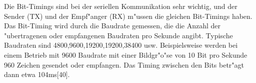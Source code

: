 Die Bit-Timings sind bei der seriellen Kommunikation sehr wichtig, 
und der Sender (TX) und der Empf"anger (RX) m"ussen die gleichen Bit-Timings 
haben. Das Bit-Timing wird durch die Baudrate gemessen, die die Anzahl 
der "ubertragenen oder empfangenen Baudraten pro Sekunde angibt. 
Typische Baudraten sind 4800,9600,19200,19200,38400 usw. 
Beispielsweise werden bei einem Betrieb mit 9600 Baudrate mit einer 
Bildgr"o"se von 10 Bit pro Sekunde 960 Zeichen gesendet oder empfangen. 
Das Timing zwischen den Bits betr"agt dann etwa 104ms[40]. 















